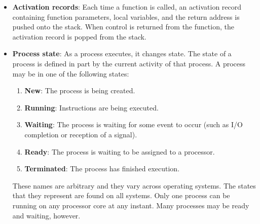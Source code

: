 \documentclass{report}
\begin{document}
\begin{itemize}
            \begin{itemize}
                \item \textbf{Text section}: the executable code
                \item \textbf{Data section}: global variables
                \item \textbf{Heap section}: memory that is dynamically allocated during program run time.
                \item \textbf{Stack section}: temporary data storage when invoking functions (such as function parameters, return addresses, and local variables)
            \end{itemize}
            The stack and heap sections can shrink and grow dynamically during program execution.
            \bigbreak \noindent 
            Stack and heap grow towards each other, but the OS makes sure that they do not overlap.
        \item \textbf{Activation records}: Each time a function is called, an activation record containing function parameters, local variables, and the return address is pushed onto the stack. When control is returned from the function, the activation record is popped from the stack.
        \item \textbf{Process state}: As a process executes, it changes state. The state of a process is defined in part by the current activity of that process.
            \bigbreak \noindent 
            A process may be in one of the following states:
            \begin{enumerate}
                \item \textbf{New}: The process is being created.
                \item \textbf{Running}: Instructions are being executed.
                \item \textbf{Waiting}: The process is waiting for some event to occur (such as I/O completion or reception of a signal).
                \item \textbf{Ready}: The process is waiting to be assigned to a processor.
                \item \textbf{Terminated}: The process has finished execution.
            \end{enumerate}
            \bigbreak \noindent 
            These names are arbitrary and they vary across operating systems. The states that they represent are found on all systems.
            \bigbreak \noindent 
            Only one process can be running on any processor core at any instant. Many processes may be ready and waiting, however.

\end{itemize}
\end{document}
